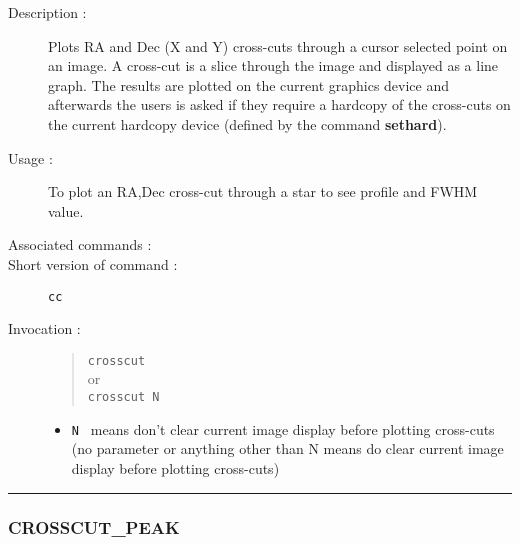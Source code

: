 \begin{description}

\item[Description :] Plots RA and Dec (X and Y) cross-cuts through a
cursor selected point on an image.  A cross-cut is a slice through the
image and displayed as a line graph.  The results are plotted on the
current graphics device and afterwards the users is asked if they
require a hardcopy of the cross-cuts on the current hardcopy device
(defined by the command {\bf sethard}).

\item[Usage :] To plot an RA,Dec cross-cut through a star to see profile
and FWHM value.
\item[Associated commands :] {\tt {}}
\item[Short version of command :] {\tt cc}
\item[Invocation :]

\begin{quote}{\tt  crosscut }\\
or \\
{\tt crosscut N }
\end{quote}

\begin{itemize}

\item {\tt N } means don't clear current image display before plotting
cross-cuts (no parameter or anything other than N means
do clear current image display before plotting cross-cuts)
\end{itemize}

\end{description}

\hrule 
\subsubsection*{\label{CROSSCUT_PEAK}CROSSCUT\_PEAK}

